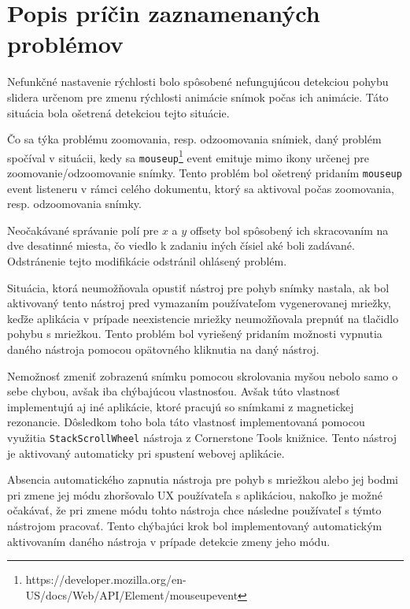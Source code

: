 \section {Popis príčin zaznamenaných problémov}
Nefunkčné nastavenie rýchlosti bolo spôsobené nefungujúcou detekciou pohybu slidera určenom pre zmenu rýchlosti animácie snímok počas ich animácie. Táto situácia bola ošetrená detekciou tejto situácie.

Čo sa týka problému zoomovania, resp. odzoomovania snímiek, daný problém spočíval v situácii, kedy sa \texttt{mouseup}\footnote{https://developer.mozilla.org/en-US/docs/Web/API/Element/mouseup\textunderscore event} event emituje mimo ikony určenej pre zoomovanie/odzoomovanie snímky. Tento problém bol ošetrený pridaním \texttt{mouseup} event listeneru v rámci celého dokumentu, ktorý sa aktivoval počas zoomovania, resp. odzoomovania snímky.

Neočakávané správanie polí pre $x$ a $y$ offsety bol spôsobený ich skracovaním na dve desatinné miesta, čo viedlo k zadaniu iných čísiel aké boli zadávané. Odstránenie tejto modifikácie odstránil ohlásený problém.

Situácia, ktorá neumožňovala opustiť nástroj pre pohyb snímky nastala, ak bol aktivovaný tento nástroj pred vymazaním používateľom vygenerovanej mriežky, keďže aplikácia v prípade neexistencie mriežky neumožňovala prepnúť na tlačidlo pohybu s mriežkou. Tento problém bol vyriešený pridaním možnosti vypnutia daného nástroja pomocou opätovného kliknutia na daný nástroj.

Nemožnosť zmeniť zobrazenú snímku pomocou skrolovania myšou nebolo samo o sebe chybou, avšak iba chýbajúcou vlastnosťou. Avšak túto vlastnosť implementujú aj iné aplikácie, ktoré pracujú so snímkami z magnetickej rezonancie. Dôsledkom toho bola táto vlastnosť implementovaná pomocou využitia \texttt{StackScrollWheel} nástroja z Cornerstone Tools knižnice. Tento nástroj je aktivovaný automaticky pri spustení webovej aplikácie.

Absencia automatického zapnutia nástroja pre pohyb s mriežkou alebo jej bodmi pri zmene jej módu zhoršovalo UX používateľa s aplikáciou, nakoľko je možné očakávať, že pri zmene módu tohto nástroja chce následne používateľ s týmto nástrojom pracovať. Tento chýbajúci krok bol implementovaný automatickým aktivovaním daného nástroja v prípade detekcie zmeny jeho módu.